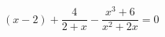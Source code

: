 \begin{ex}[type=equation]
	\begin{condition}
		$(x - 2) + \dfrac{4}{2 + x} - \dfrac{x^3 + 6}{x^2 + 2x} = 0$
	\end{condition}
\end{ex}